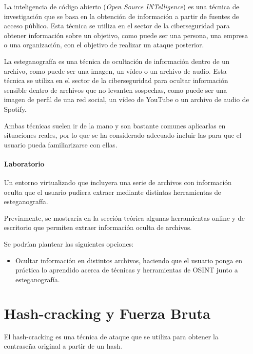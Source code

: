         La inteligencia de código abierto (\textit{Open Source INTelligence}) es una técnica de investigación que se basa en la obtención de información a partir de fuentes de acceso público. Esta técnica se utiliza en el sector de la ciberseguridad para obtener información sobre un objetivo, como puede ser una persona, una empresa o una organización, con el objetivo de realizar un ataque posterior.

        La esteganografía es una técnica de ocultación de información dentro de un archivo, como puede ser una imagen, un vídeo o un archivo de audio. Esta técnica se utiliza en el sector de la ciberseguridad para ocultar información sensible dentro de archivos que no levanten sospechas, como puede ser una imagen de perfil de una red social, un vídeo de YouTube o un archivo de audio de Spotify.

        Ambas técnicas suelen ir de la mano y son bastante comunes aplicarlas en situaciones reales, por lo que se ha considerado adecuado incluir las para que el usuario pueda familiarizarse con ellas.
            
        \paragraph{Laboratorio}

            Un entorno virtualizado que incluyera una serie de archivos con información oculta que el usuario pudiera extraer mediante distintas herramientas de esteganografía.

            Previamente, se mostraría en la sección teórica algunas herramientas online y de escritorio que permiten extraer información oculta de archivos.

            Se podrían plantear las siguientes opciones:
            
            \begin{itemize}
                \item Ocultar información en distintos archivos, haciendo que el usuario ponga en práctica lo aprendido acerca de técnicas y herramientas de OSINT junto a esteganografía.
            \end{itemize}

        
        \section{Hash-cracking y Fuerza Bruta}

            El hash-cracking es una técnica de ataque que se utiliza para obtener la contraseña original a partir de un hash.

